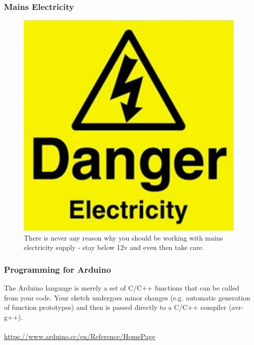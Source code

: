 \begin{frame}
 	\frametitle{Mains Electricity}
   	\begin{figure}
   		\includegraphics[scale=.3]{assets/240} 
		\caption{There is never any reason why you should be working with mains electricity supply - stay below 12v and even then take care.}
	\end{figure}
\end{frame}

\begin{frame}
 	\frametitle{Programming for Arduino}
	The Arduino language is merely a set of C/C++ functions that can be called from your code. Your sketch undergoes minor changes (e.g. automatic 	generation of function prototypes) and then is passed directly to a C/C++ compiler (avr-g++). \\~\\   
	\url{https://www.arduino.cc/en/Reference/HomePage}
	
\end{frame}

